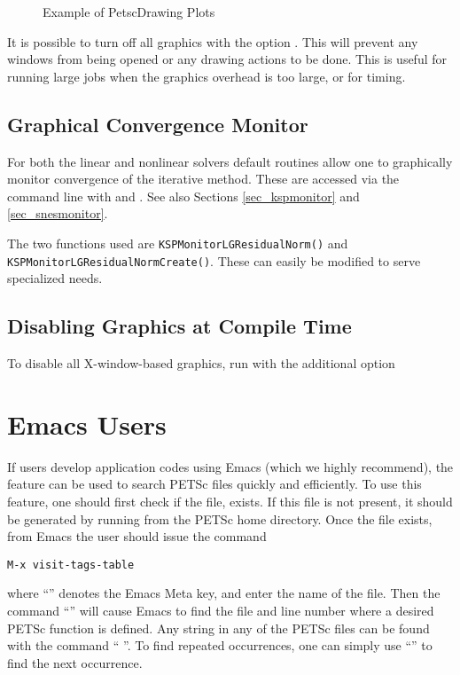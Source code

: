 {{\begin{figure}[H]

\caption{Example of PetscDrawing Plots}
\label{fig_plot}
\end{figure}

It is possible to turn off all graphics with the option 
. This
will prevent any windows from being opened or any drawing actions to be done.
This is useful for running large jobs when the graphics overhead is too
large, or for timing.

\subsection{Graphical Convergence Monitor}
For both the linear and nonlinear solvers default routines
allow one to graphically monitor convergence of the iterative method.
These are accessed via the command line with
 and . 
 See also Sections \ref{sec_kspmonitor} and
\ref{sec_snesmonitor}.

The two functions used are \lstinline{KSPMonitorLGResidualNorm()}
and \break\lstinline{KSPMonitorLGResidualNormCreate()}. These
can easily be modified to serve specialized needs.

\subsection{Disabling Graphics at Compile Time}

To disable all X-window-based graphics, run  with the
additional option 

\section{Emacs Users}  \label{sec_emacs}

 
If users develop application codes  using Emacs (which we
highly recommend), the  feature can be used to search PETSc
files quickly and efficiently.  To use this feature, one should
first check if the file,
 exists.  If this file is
not present, it should be generated by
running   from the PETSc home directory.
Once the file exists, from
Emacs the user should issue
the command
\begin{lstlisting}
M-x visit-tags-table
\end{lstlisting}
 where ``''
denotes the Emacs Meta key, and enter the
name of the  file. Then the command ``'' will cause Emacs
to find the file and line number where a desired PETSc function
is defined.  Any string in any of the PETSc files can be found with the
command `` ''. To find repeated occurrences,
one can simply use ``'' to find the next occurrence.

}}
